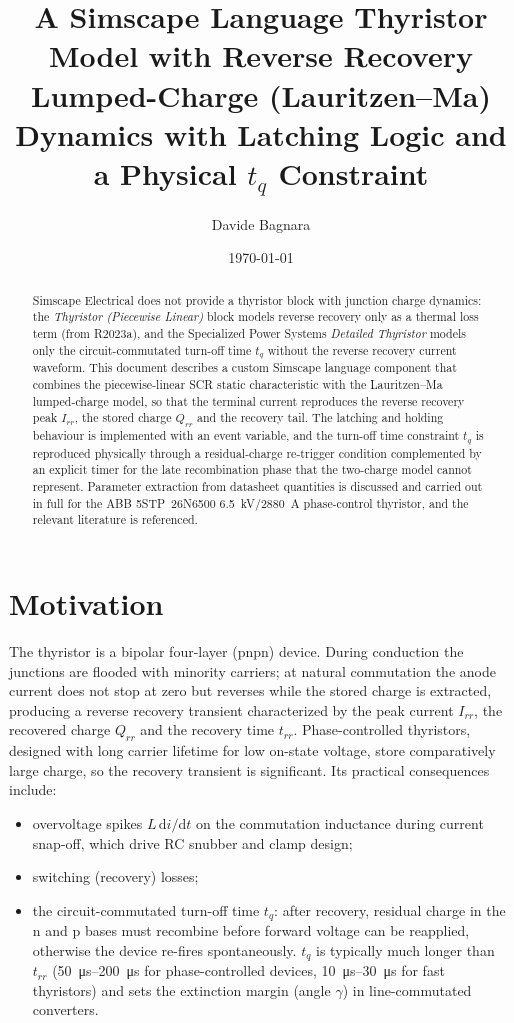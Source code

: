 \documentclass[11pt,a4paper]{article}
\title{A Simscape Language Thyristor Model with Reverse Recovery\\
\large Lumped-Charge (Lauritzen--Ma) Dynamics with Latching Logic and a Physical $t_q$ Constraint}
\author{Davide Bagnara}
\date{\today}
\begin{document}
\maketitle

\begin{abstract}
Simscape Electrical does not provide a thyristor block with junction charge
dynamics: the \emph{Thyristor (Piecewise Linear)} block models reverse
recovery only as a thermal loss term (from R2023a), and the Specialized Power
Systems \emph{Detailed Thyristor} models only the circuit-commutated turn-off
time $t_q$ without the reverse recovery current waveform. This document
describes a custom Simscape language component that combines the
piecewise-linear SCR static characteristic with the Lauritzen--Ma lumped-charge
model, so that the terminal current reproduces the reverse recovery peak
$I_{rr}$, the stored charge $Q_{rr}$ and the recovery tail. The latching and
holding behaviour is implemented with an event variable, and the turn-off time
constraint $t_q$ is reproduced physically through a residual-charge re-trigger
condition complemented by an explicit timer for the late recombination phase that the
two-charge model cannot represent. Parameter extraction from datasheet
quantities is discussed and carried out in full for the ABB 5STP~26N6500
\SI{6.5}{\kilo\volt}/\SI{2880}{\ampere} phase-control thyristor, and the
relevant literature is referenced.
\end{abstract}

\section{Motivation}

The thyristor is a bipolar four-layer (pnpn) device. During conduction the
junctions are flooded with minority carriers; at natural commutation the anode
current does not stop at zero but reverses while the stored charge is
extracted, producing a reverse recovery transient characterized by the peak
current $I_{rr}$, the recovered charge $Q_{rr}$ and the recovery time
$t_{rr}$. Phase-controlled thyristors, designed with long carrier lifetime for
low on-state voltage, store comparatively large charge, so the recovery
transient is significant. Its practical consequences include:

\begin{itemize}
  \item overvoltage spikes $L\,\mathrm{d}i/\mathrm{d}t$ on the commutation
        inductance during current snap-off, which drive RC snubber and clamp
        design;
  \item switching (recovery) losses;
  \item the circuit-commutated turn-off time $t_q$: after recovery, residual
        charge in the n and p bases must recombine before forward voltage can
        be reapplied, otherwise the device re-fires spontaneously. $t_q$ is
        typically much longer than $t_{rr}$ (\SIrange{50}{200}{\micro\second}
        for phase-controlled devices, \SIrange{10}{30}{\micro\second} for fast
        thyristors) and sets the extinction margin (angle $\gamma$) in
        line-commutated converters.
\end{itemize}
\end{document}
